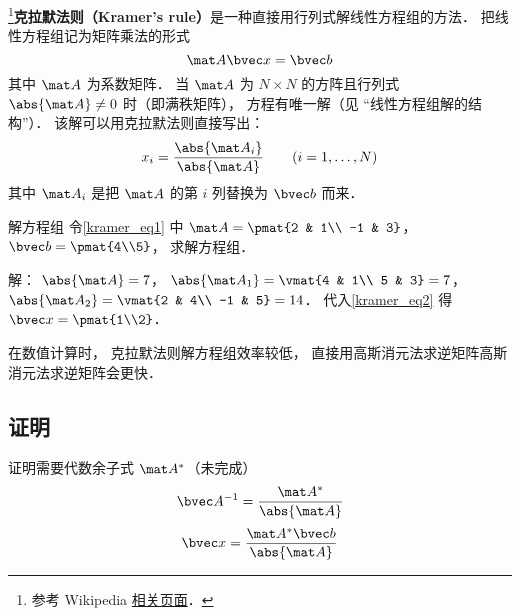 
\begin{issues}
\issueTODO
\end{issues}


\footnote{参考 Wikipedia \href{https://en.wikipedia.org/wiki/Cramer's_rule}{相关页面}．}\textbf{克拉默法则（Kramer's rule）}是一种直接用行列式解线性方程组的方法． 把线性方程组记为矩阵乘法的形式
\begin{equation}\label{kramer_eq1}
\mat A \bvec x = \bvec b
\end{equation}
其中 $\mat A$ 为系数矩阵． 当 $\mat A$ 为 $N\times N$ 的方阵且行列式 $\abs{\mat A} \ne 0$ 时（即满秩矩阵）， 方程有唯一解（见 “线性方程组解的结构”）． 该解可以用克拉默法则直接写出：
\begin{equation}\label{kramer_eq2}
x_i = \frac{\abs{\mat A_i}}{\abs{\mat A}} \qquad (i = 1, \dots, N)
\end{equation}
其中 $\mat A_i$ 是把 $\mat A$ 的第 $i$ 列替换为 $\bvec b$ 而来．

\begin{example}{解方程组}
令\autoref{kramer_eq1} 中 $\mat A = \pmat{2 & 1\\ -1 & 3}$， $\bvec b = \pmat{4\\5}$， 求解方程组．

解： $\abs{\mat A} = 7$， $\abs{\mat A_1} = \vmat{4 & 1\\ 5 & 3} = 7$， $\abs{\mat A_2} = \vmat{2 & 4\\ -1 & 5} = 14$． 代入\autoref{kramer_eq2} 得 $\bvec x = \pmat{1\\2}$．
\end{example}

在数值计算时， 克拉默法则解方程组效率较低， 直接用高斯消元法求逆矩阵高斯消元法求逆矩阵会更快．

\subsection{证明}
证明需要代数余子式 $\mat A^*$（未完成）
\begin{equation}
\bvec A^{-1} = \frac{\mat A^*}{\abs{\mat A}}
\end{equation}
\begin{equation}
\bvec x = \frac{\mat A^* \bvec b}{\abs{\mat A}}
\end{equation}
